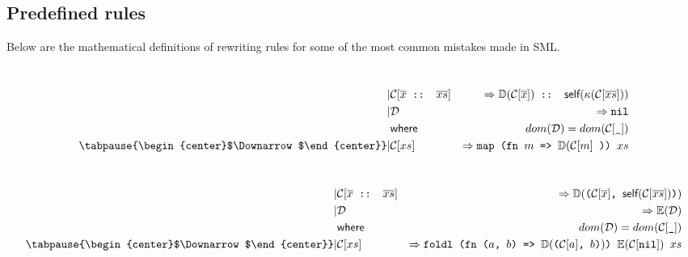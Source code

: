 \subsection{Predefined rules}

Below are the mathematical definitions of rewriting rules for some of the most
common mistakes made in SML.

\begin{definition} \ \\

  \begin{eqnarray*}[rqrl]
    | & \mathcal{C}  [\overline{x} \texttt{ :: } \overline{xs}] &  => \mathbb{D}
    (\mathcal{C}[ \overline{x}]) \texttt{ :: } \textsf{self}(\kappa ( \mathcal{C}
    [ \overline{xs} ] ) ) \\
    | & \mathcal{D} & => \texttt{nil}\\
    & \textsf{where}\ \ & dom(\mathcal{D}) = dom(\mathcal{C}[\texttt{\_}])\\
   \tabpause{\begin{center}$\Downarrow$\end{center}}
    | & \mathcal{C} [ xs ] & => \texttt{map (fn $m$ => $\mathbb{D}(\mathcal{C} [ m ]$ )) $xs$}
  \end{eqnarray*}
\end{definition}
\begin{definition} \ \\

  \begin{eqnarray*}[rqrl]
    | & \mathcal{C}[\overline{x} \texttt{ :: } \overline{xs}] &
    => \mathbb{D} ( \texttt{($\mathcal{C}
      [\overline{x}]$, $\textsf{self}( \mathcal{C}[\overline{xs}])$)} ) \\
    | & \mathcal{D} & => \mathbb{E}(\mathcal{D})\\
    & \textsf{where}\ \ & dom(\mathcal{D}) = dom(\mathcal{C}[\texttt{\_}])\\
    \tabpause{\begin{center}$\Downarrow$\end{center}}  
    | & \mathcal{C} [xs] & => \texttt{foldl (fn ($a$, $b$) => $\mathbb{D}($($\mathcal{C}[a]$, $b$)$)$) $\mathbb{E}(\mathcal{C}[\texttt{nil}])$ $xs$}
  \end{eqnarray*}
\end{definition}


